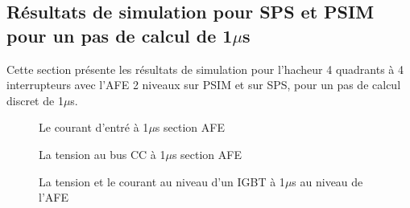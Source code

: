 \subsection{Résultats de simulation pour SPS et PSIM pour un pas de calcul de 1$\mu$s}
Cette section présente les résultats de simulation pour l'hacheur 4 quadrants à 4 interrupteurs avec l'AFE 2 niveaux sur PSIM et sur SPS, pour un pas de calcul discret de 1$\mu$s. 


\begin{figure}[htb]
\caption{Le courant d'entré à 1$\mu$s section AFE}
\label{AF_HA_cou1}
\end{figure}


\begin{figure}[htb]
\caption{La tension au bus CC à 1$\mu$s section AFE}
\label{AF_HA_vch1}
\end{figure}



\begin{figure}[htb]
\caption{La tension et le courant au niveau d'un IGBT à 1$\mu$s au niveau de l'AFE}
\label{AF_HA_IGBT1}
\end{figure}


